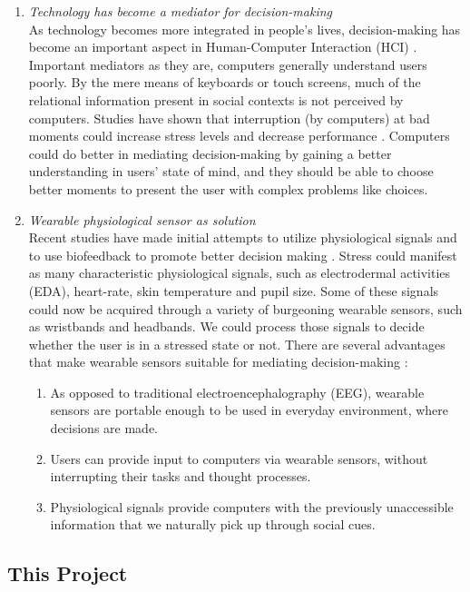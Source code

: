 \documentclass[12pt]{article}
\begin{document}
\begin{enumerate}
\item{\it Technology has become a mediator for decision-making}\\
As technology becomes more integrated in people's lives, decision-making has become an important aspect in Human-Computer Interaction (HCI) \cite{Zhou2015}.
Important mediators as they are, computers generally understand users poorly. By the mere means of keyboards or touch screens, much of the relational information present in social contexts is not perceived by computers. Studies have shown that interruption (by computers) at bad moments could increase stress levels and decrease performance \cite{Carton2009}. 
Computers could do better in mediating decision-making by gaining a better understanding in users' state of mind, and they should be able to choose better moments to present the user with complex problems like choices.\\


\item{\it Wearable physiological sensor as solution}\\
Recent studies have made initial attempts to utilize physiological signals and to use biofeedback to promote better decision making \cite{Carroll2013, Zhou2015}. 
  Stress could manifest as many characteristic physiological signals, such as electrodermal activities (EDA), heart-rate, skin temperature and pupil size. 
  Some of these signals could now be acquired through a variety of burgeoning wearable sensors, such as wristbands and headbands. We could process those  signals to decide whether the user is in a stressed state or not. There are several advantages that make wearable sensors suitable for mediating decision-making \cite{Peck2014}:
  \begin{enumerate} 
  \itemsep0pt\parskip0pt
    \item As opposed to traditional electroencephalography (EEG), wearable sensors are portable enough to be used in everyday  environment, where decisions are made.
    \item Users can provide input to computers via wearable sensors, without interrupting their tasks and thought processes.
    \item Physiological signals provide computers with the previously unaccessible  information that we naturally pick up through social cues.
  \end{enumerate}
\end{enumerate}

\subsection{This Project}\label{this-project}
\end{document}
